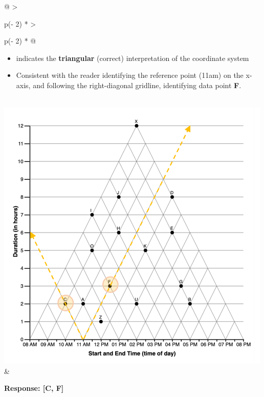 \documentclass[
  letterpaper,
  DIV=11,
  numbers=noendperiod]{scrreprt}
\begin{document}
\begin{longtable}[]{@{}
  >{\raggedright\arraybackslash}p{(\columnwidth - 2\tabcolsep) * }
  >{\raggedright\arraybackslash}p{(\columnwidth - 2\tabcolsep) * }@{}}
\begin{minipage}[t]{\linewidth}
\begin{itemize}
\item
  indicates the \textbf{triangular} (correct) interpretation of the
  coordinate system
\item
  Consistent with the reader identifying the reference point (11am) on
  the x-axis, and following the right-diagonal gridline, identifying
  data point \textbf{F}.
\end{itemize}
\end{minipage} \\
\includegraphics[width=5.20833in,height=\textheight]{analysis/SGC3A/static/interpretations/Q1_111_CF.png}
& \begin{minipage}[t]{\linewidth}\raggedright
\textbf{Response: {[}C, F{]}}


\end{minipage}
\end{longtable}
\end{document}
